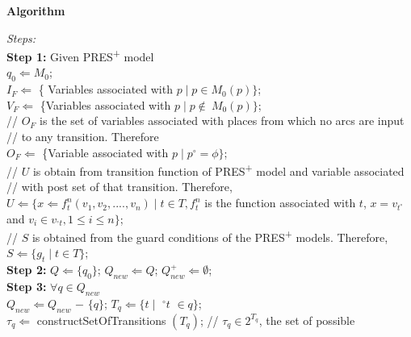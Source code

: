 \documentclass[9pt,executive]{article}
\def\presp{PRES\textsuperscript{+}}
\def\algofunction{constructSetOfTransitions}
\def\presp{PRES\textsuperscript{+}}
\def\algofunction{constructSetOfTransitions}
\begin{document}
{\bf Algorithm}

\noindent
{\it Steps:}\\
{\bf Step 1:} Given {\presp} model\\
\hspace*{0.42in} $q_0 \Leftarrow M_0$;\\
\hspace*{0.42in} $I_F \Leftarrow$ \{ Variables associated with $p \mid p \in M_0(p)\}$;\\
\hspace*{0.42in} $V_F \Leftarrow$ \{Variables associated with $p \mid p \notin\ M_0(p)\}$;\\ 
\hspace*{0.42in} // $O_F$ is the set of variables  associated with places from which no arcs are input 
\hspace*{0.42in} // to any transition. Therefore \\
\hspace*{0.42in} $O_F \Leftarrow$ \{Variable associated with $p \mid p ^\circ = \phi\}$;\\
\hspace*{0.42in} // $U$ is obtain from transition function of {\presp} model and variable associated
\hspace*{0.42in} // with post set of that transition. Therefore,\\ 
\hspace*{0.42in} $U \Leftarrow \{x \Leftarrow f_t^{n} (v_1, v_2, ...., v_n) \mid t \in T, f_t^{n}$ is the function associated with  
\hspace*{0.48in} $t$, $ x = v_{t ^\circ} $ and $ v_i \in v_{^\circ{t}}, 1 \leq i \leq n \}$;\\ 
\hspace*{0.42in} // $S$ is obtained from the guard conditions  of the {\presp} models. Therefore,\\
\hspace*{0.42in} $S  \Leftarrow  \{ g_t \mid t \in T \}$;\\ 
{\bf Step 2:} $Q \Leftarrow  \{q_0\}$; $Q_{new} \Leftarrow Q$; $Q_{new}^+ \Leftarrow \emptyset$;\\
{\bf Step 3:} $\forall q \in Q_{new}$ \\
\newpage
\hspace*{0.25in}{\bf Step 3.1:}$Q_{new} \Leftarrow Q_{new}$ $-$ $\{q\}$; $T_q \Leftarrow \{t \mid $  $^\circ{t}$ $\in q\}$;\\
\hspace*{0.81in}$\tau_q \Leftarrow$ {\algofunction} $(T_q)$; // $\tau_q \in 2^{T_q}$, the set of possible\\
\end{document}
